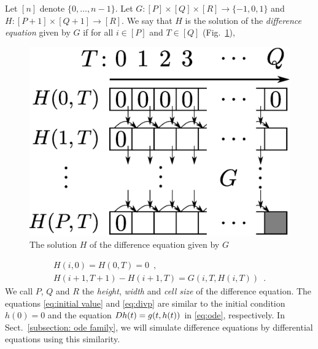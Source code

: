 Let $[n]$ denote $\{0, \dots , n-1\}$.
Let $G \colon [P] \times [Q] \times [R] \to \{-1, 0, 1\}$ and
$H \colon [P + 1] \times [Q+1] \to [R]$. 
We say that $H$ is the solution of the \emph{difference equation} given by $G$
if for all $i \in [P]$ and $T \in [Q]$ (Fig.~\ref{fig:divp}), 
\begin{figure}[tb]
 \begin{center}
  \includegraphics[height=0.15\textheight]{image/divp.eps}
 \end{center}
 \caption{The solution $H$ of the difference equation given by $G$}
 \label{fig:divp}
\end{figure}
\begin{gather}
   H(i, 0) = H(0, T) = 0 \enspace , \label{eq:initial value}
\\
   H(i + 1, T + 1) - H(i+1, T) = G(i, T, H(i, T)) \enspace .  \label{eq:divp}
\end{gather}
We call $P$, $Q$ and $R$ the \emph{height}, \emph{width} and \emph{cell size} of
the difference equation.
The equations \eqref{eq:initial value} and \eqref{eq:divp} are similar to 
the initial condition $h(0) = 0$ and the equation $D h(t) = g(t, h(t))$ 
in \eqref{eq:ode}, respectively.
In Sect.~\ref{subsection: ode family}, we will simulate difference equations by differential equations using this similarity.

